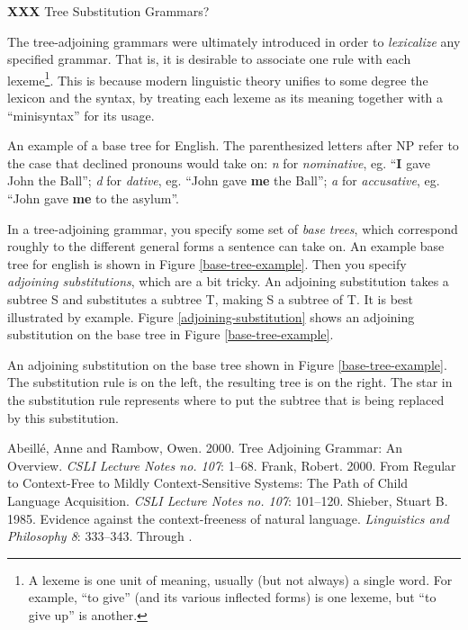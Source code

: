 \documentclass[12pt]{article}
\newcommand{\defn}[1]{\textit{#1}}
\begin{document}
\textbf{XXX} Tree Substitution Grammars?

The tree-adjoining grammars were ultimately introduced in order to
\defn{lexicalize} any specified grammar.  That is, it is desirable to
associate one rule with each lexeme\footnote{A lexeme is one unit of
meaning, usually (but not always) a single word.  For example, ``to
give'' (and its various inflected forms) is one lexeme, but ``to give
up'' is another.}.  This is because modern linguistic theory unifies to
some degree the lexicon and the syntax, by treating each lexeme as its
meaning together with a ``minisyntax'' for its usage.

\begin{Figure}
\begin{center}
\end{center}
\caption{An example of a base tree for English.  The parenthesized
letters after NP refer to the case that declined pronouns would take on:
\textit{n} for \defn{nominative}, eg. ``\textbf{I} gave John the
Ball''; \textit{d} for \defn{dative}, eg. ``John gave \textbf{me} the
Ball''; \textit{a} for \defn{accusative}, eg.  ``John gave \textbf{me}
to the asylum''.}
\label{base-tree-example}
\end{Figure}

In a tree-adjoining grammar, you specify some set of \defn{base
trees}, which correspond roughly to the different general forms a
sentence can take on.  An example base tree for english is shown in
Figure \ref{base-tree-example}.  Then you specify \defn{adjoining
substitutions}, which are a bit tricky.  An adjoining substitution takes
a subtree S and substitutes a subtree T, making S a subtree of T.  It is
best illustrated by example.  Figure \ref{adjoining-substitution} shows
an adjoining substitution on the base tree in Figure
\ref{base-tree-example}.

\begin{Figure}
\begin{center}
\end{center}
\caption{An adjoining substitution on the base tree shown in Figure
\ref{base-tree-example}.  The substitution rule is on the left, the
resulting tree is on the right.  The star in the substitution rule
represents where to put the subtree that is being replaced by this
substitution.}
\label{adjoining-substitution}
\end{Figure}

\clearpage

\singlespace
\begin{thebibliography}{4in}
 Abeill\'e, Anne and Rambow, Owen.  2000.  Tree
Adjoining Grammar: An Overview.  \textit{CSLI Lecture Notes no. 107}:
1--68.
 Frank, Robert.  2000.  From Regular to Context-Free
to Mildly Context-Sensitive Systems: The Path of Child Language
Acquisition.  \textit{CSLI Lecture Notes no. 107}: 101--120.
 Shieber, Stuart B.  1985. Evidence against the
context-freeness of natural language.  \textit{Linguistics and
Philosophy 8}: 333--343.  Through \cite{Abeille-2000}.
\end{thebibliography}
\end{document}
